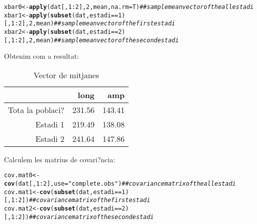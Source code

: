\documentclass[a4paper,titlepage,12pt]{article}\usepackage[]{graphicx}\usepackage[]{color}
\makeatletter
\newcommand{\hlnum}[1]{\textcolor[rgb]{0.686,0.059,0.569}{#1}}%
\newcommand{\hlstr}[1]{\textcolor[rgb]{0.192,0.494,0.8}{#1}}%
\newcommand{\hlcom}[1]{\textcolor[rgb]{0.678,0.584,0.686}{\textit{#1}}}%
\newcommand{\hlopt}[1]{\textcolor[rgb]{0,0,0}{#1}}%
\newcommand{\hlstd}[1]{\textcolor[rgb]{0.345,0.345,0.345}{#1}}%
\newcommand{\hlkwb}[1]{\textcolor[rgb]{0.69,0.353,0.396}{#1}}%
\newcommand{\hlkwc}[1]{\textcolor[rgb]{0.333,0.667,0.333}{#1}}%
\newcommand{\hlkwd}[1]{\textcolor[rgb]{0.737,0.353,0.396}{\textbf{#1}}}%
\newenvironment{kframe}{%
 \def\at@end@of@kframe{}%
 \ifinner\ifhmode%
  \def\at@end@of@kframe{\end{minipage}}%
  \begin{minipage}{\columnwidth}%
 \fi\fi%
 \def\FrameCommand##1{\hskip\@totalleftmargin \hskip-\fboxsep
 \colorbox{shadecolor}{##1}\hskip-\fboxsep
     \hskip-\linewidth \hskip-\@totalleftmargin \hskip\columnwidth}%
 \MakeFramed {\advance\hsize-\width
   \@totalleftmargin\z@ \linewidth\hsize
   \@setminipage}}%
 {\par\unskip\endMakeFramed%
 \at@end@of@kframe}
\newenvironment{knitrout}{}{} %
\makeatother
\begin{document}
\begin{knitrout}
\color{fgcolor}\begin{kframe}
\begin{alltt}
\hlstd{xbar0} \hlkwb{<-} \hlkwd{apply}\hlstd{(dat[,} \hlnum{1}\hlopt{:}\hlnum{2}\hlstd{],} \hlnum{2}\hlstd{, mean,} \hlkwc{na.rm} \hlstd{= T)}  \hlcom{## sample mean vector of the all estadi}
\hlstd{xbar1} \hlkwb{<-} \hlkwd{apply}\hlstd{(}\hlkwd{subset}\hlstd{(dat, estadi} \hlopt{==} \hlnum{1}\hlstd{)[,} \hlnum{1}\hlopt{:}\hlnum{2}\hlstd{],} \hlnum{2}\hlstd{, mean)}  \hlcom{## sample mean vector of the first estadi}
\hlstd{xbar2} \hlkwb{<-} \hlkwd{apply}\hlstd{(}\hlkwd{subset}\hlstd{(dat, estadi} \hlopt{==} \hlnum{2}\hlstd{)[,} \hlnum{1}\hlopt{:}\hlnum{2}\hlstd{],} \hlnum{2}\hlstd{, mean)}  \hlcom{## sample mean vector of the second estadi}
\end{alltt}
\end{kframe}
\end{knitrout}

Obtenim com a resultat:
\begin{table}[ht]
\centering
\caption{Vector de mitjanes} 
\begin{tabular}{rrr}
  \hline
 & long & amp \\ 
  \hline
Tota la poblaci? & 231.56 & 143.41 \\ 
  Estadi 1 & 219.49 & 138.08 \\ 
  Estadi 2 & 241.64 & 147.86 \\ 
   \hline
\end{tabular}
\end{table}


Calculem les matrius de covari?ncia: 
\begin{knitrout}
\color{fgcolor}\begin{kframe}
\begin{alltt}
\hlstd{cov.mat0} \hlkwb{<-} \hlkwd{cov}\hlstd{(dat[,} \hlnum{1}\hlopt{:}\hlnum{2}\hlstd{],} \hlkwc{use} \hlstd{=} \hlstr{"complete.obs"}\hlstd{)}  \hlcom{## covariance matrix of the all estadi}
\hlstd{cov.mat1} \hlkwb{<-} \hlkwd{cov}\hlstd{(}\hlkwd{subset}\hlstd{(dat, estadi} \hlopt{==} \hlnum{1}\hlstd{)[,} \hlnum{1}\hlopt{:}\hlnum{2}\hlstd{])}  \hlcom{## covariance matrix of the first estadi}
\hlstd{cov.mat2} \hlkwb{<-} \hlkwd{cov}\hlstd{(}\hlkwd{subset}\hlstd{(dat, estadi} \hlopt{==} \hlnum{2}\hlstd{)[,} \hlnum{1}\hlopt{:}\hlnum{2}\hlstd{])}  \hlcom{## covariance matrix of the second estadi}
\end{alltt}
\end{kframe}
\end{knitrout}
\end{document}
